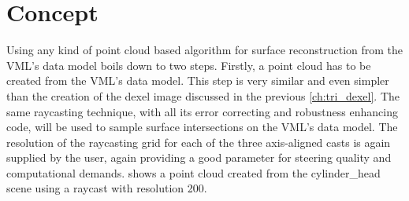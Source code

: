 \section{Concept}
\label{sec:point_cloud_concept}

Using any kind of point cloud based algorithm for surface reconstruction from the VML's data model boils down to two steps.
Firstly, a point cloud has to be created from the VML's data model.
This step is very similar and even simpler than the creation of the dexel image discussed in the previous \cref{ch:tri_dexel}.
The same raycasting technique, with all its error correcting and robustness enhancing code, will be used to sample surface intersections on the VML's data model.
The resolution of the raycasting grid for each of the three axis-aligned casts is again supplied by the user, again providing a good parameter for steering quality and computational demands.
 shows a point cloud created from the cylinder\_head scene using a raycast with resolution 200.
%
